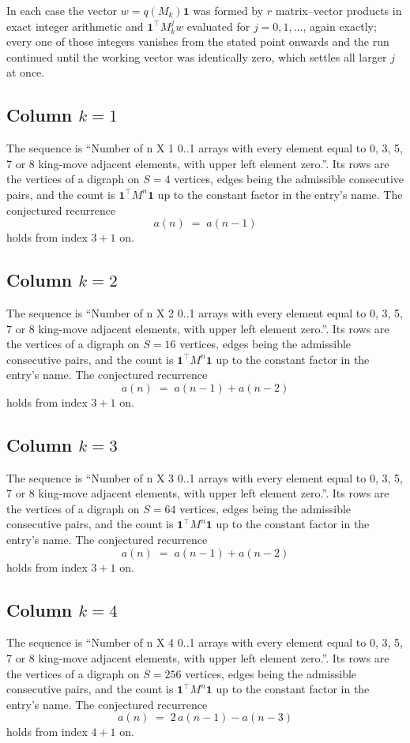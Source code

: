\documentclass[11pt,a4paper]{article}
\theoremstyle{plain}
\theoremstyle{definition}
\begin{document}
In each case the vector $w=q(M_k)\mathbf{1}$ was formed by $r$ matrix--vector products in
exact integer arithmetic and $\mathbf{1}^{\!\top}M_k^{j}w$ evaluated for $j=0,1,\dots$,
again exactly; every one of those integers vanishes from the stated point onwards and the run
continued until the working vector was identically zero, which settles all larger $j$ at once.

\subsection*{Column $k$$=1$}
The sequence is ``Number of n X 1 0..1 arrays with every element equal to 0, 3, 5, 7 or 8 king-move adjacent elements, with upper left element zero.''. Its rows are the vertices of a digraph on
$S=4$ vertices, edges being the admissible consecutive pairs, and the count is
$\mathbf{1}^{\!\top}M^{n}\mathbf{1}$ up to the constant factor in the entry's name.
The conjectured recurrence
\[
a(n)\;=\;a(n-1)
\]
holds from index $3+1$ on.

\subsection*{Column $k$$=2$}
The sequence is ``Number of n X 2 0..1 arrays with every element equal to 0, 3, 5, 7 or 8 king-move adjacent elements, with upper left element zero.''. Its rows are the vertices of a digraph on
$S=16$ vertices, edges being the admissible consecutive pairs, and the count is
$\mathbf{1}^{\!\top}M^{n}\mathbf{1}$ up to the constant factor in the entry's name.
The conjectured recurrence
\[
a(n)\;=\;a(n-1) + a(n-2)
\]
holds from index $3+1$ on.

\subsection*{Column $k$$=3$}
The sequence is ``Number of n X 3 0..1 arrays with every element equal to 0, 3, 5, 7 or 8 king-move adjacent elements, with upper left element zero.''. Its rows are the vertices of a digraph on
$S=64$ vertices, edges being the admissible consecutive pairs, and the count is
$\mathbf{1}^{\!\top}M^{n}\mathbf{1}$ up to the constant factor in the entry's name.
The conjectured recurrence
\[
a(n)\;=\;a(n-1) + a(n-2)
\]
holds from index $3+1$ on.

\subsection*{Column $k$$=4$}
The sequence is ``Number of n X 4 0..1 arrays with every element equal to 0, 3, 5, 7 or 8 king-move adjacent elements, with upper left element zero.''. Its rows are the vertices of a digraph on
$S=256$ vertices, edges being the admissible consecutive pairs, and the count is
$\mathbf{1}^{\!\top}M^{n}\mathbf{1}$ up to the constant factor in the entry's name.
The conjectured recurrence
\[
a(n)\;=\;2\,a(n-1) - a(n-3)
\]
holds from index $4+1$ on.
\end{document}

